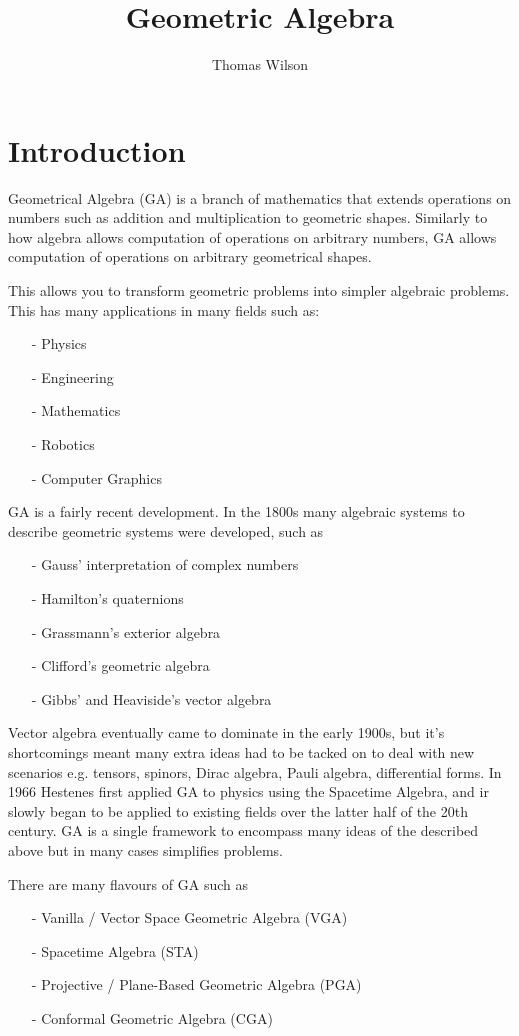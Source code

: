 \documentclass[options]{report}
\title{Geometric Algebra}
\author{Thomas Wilson}
\begin{document}
\maketitle

\chapter{Introduction}
Geometrical Algebra (GA) is a branch of mathematics that extends operations on numbers such as addition and multiplication to geometric shapes. Similarly to how algebra allows computation of operations on arbitrary numbers, GA allows computation of operations on arbitrary geometrical shapes.

This allows you to transform geometric problems into simpler algebraic problems. This has many applications in many fields such as:
\begin{itemize}
\item[-] Physics
\item[-] Engineering
\item[-] Mathematics
\item[-] Robotics
\item[-] Computer Graphics
\end{itemize}

GA is a fairly recent development. In the 1800s many algebraic systems to describe geometric systems were developed, such as
\begin{itemize}
	\item[-] Gauss' interpretation of complex numbers
	\item[-] Hamilton's quaternions
	\item[-] Grassmann's exterior algebra
	\item[-] Clifford's geometric algebra
	\item[-] Gibbs' and Heaviside's vector algebra
\end{itemize}

Vector algebra eventually came to dominate in the early 1900s, but it's shortcomings meant many extra ideas had to be tacked on to deal with new scenarios e.g. tensors, spinors, Dirac algebra, Pauli algebra, differential forms. In 1966 Hestenes first applied GA to physics using the Spacetime Algebra, and ir slowly began to be applied to existing fields over the latter half of the 20th century. GA is a single framework to encompass many ideas of the described above but in many cases simplifies problems.

There are many flavours of GA such as
\begin{itemize}
	\item[-] Vanilla / Vector Space Geometric Algebra (VGA)
	\item[-] Spacetime Algebra (STA)
	\item[-] Projective / Plane-Based Geometric Algebra (PGA)
	\item[-] Conformal Geometric Algebra (CGA)
\end{itemize}
\end{document}

